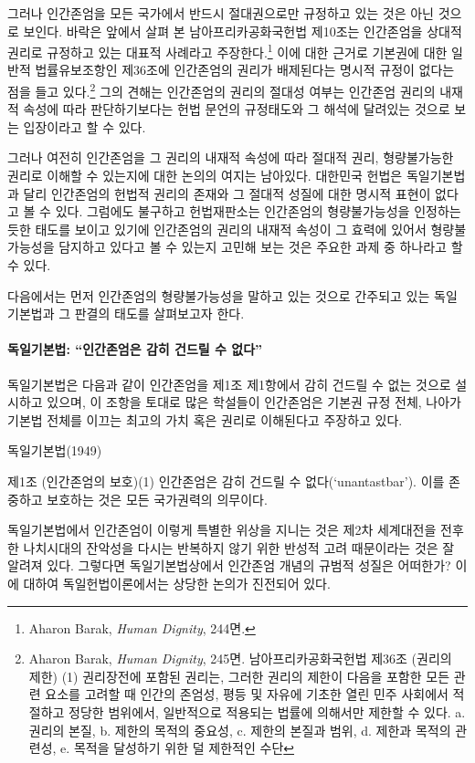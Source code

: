 그러나 인간존엄을 모든 국가에서 반드시 절대권으로만 규정하고 있는 것은 아닌 것으로 보인다. 바락은 앞에서 살펴 본 남아프리카공화국헌법 제10조는 인간존엄을 상대적 권리로 규정하고 있는 대표적 사례라고 주장한다.\footnote{Aharon Barak, \emph{Human Dignity}, 244면.} 이에 대한 근거로 기본권에 대한 일반적 법률유보조항인 제36조에 인간존엄의 권리가 배제된다는 명시적 규정이 없다는 점을 들고 있다.\footnote{Aharon Barak, \emph{Human Dignity}, 245면. 남아프리카공화국헌법 제36조 (권리의 제한) (1) 권리장전에 포함된 권리는, 그러한 권리의 제한이 다음을 포함한 모든 관련 요소를 고려할 때 인간의 존엄성, 평등 및 자유에 기초한 열린 민주 사회에서 적절하고 정당한 범위에서, 일반적으로 적용되는 법률에 의해서만 제한할 수 있다. a. 권리의 본질, b. 제한의 목적의 중요성, c. 제한의 본질과 범위, d. 제한과 목적의 관련성, e. 목적을 달성하기 위한 덜 제한적인 수단} 그의 견해는 인간존엄의 권리의 절대성 여부는 인간존엄 권리의 내재적 속성에 따라 판단하기보다는 헌법 문언의 규정태도와 그 해석에 달려있는 것으로 보는 입장이라고 할 수 있다.

그러나 여전히 인간존엄을 그 권리의 내재적 속성에 따라 절대적 권리, 형량불가능한 권리로 이해할 수 있는지에 대한 논의의 여지는 남아있다. 대한민국 헌법은 독일기본법과 달리 인간존엄의 헌법적 권리의 존재와 그 절대적 성질에 대한 명시적 표현이 없다고 볼 수 있다. 그럼에도 불구하고 헌법재판소는 인간존엄의 형량불가능성을 인정하는 듯한 태도를 보이고 있기에 인간존엄의 권리의 내재적 속성이 그 효력에 있어서 형량불가능성을 담지하고 있다고 볼 수 있는지 고민해 보는 것은 주요한 과제 중 하나라고 할 수 있다.

다음에서는 먼저 인간존엄의 형량불가능성을 말하고 있는 것으로 간주되고 있는 독일기본법과 그 판결의 태도를 살펴보고자 한다.

\paragraph{독일기본법: ``인간존엄은 감히 건드릴 수 없다''}

독일기본법은 다음과 같이 인간존엄을 제1조 제1항에서 감히 건드릴 수 없는 것으로 설시하고 있으며, 이 조항을 토대로 많은 학설들이 인간존엄은 기본권 규정 전체, 나아가 기본법 전체를 이끄는 최고의 가치 혹은 권리로 이해된다고 주장하고 있다.

독일기본법(1949)

제1조 (인간존엄의 보호)(1) 인간존엄은 감히 건드릴 수 없다(`unantastbar'). 이를 존중하고 보호하는 것은 모든 국가권력의 의무이다.

독일기본법에서 인간존엄이 이렇게 특별한 위상을 지니는 것은 제2차 세계대전을 전후한 나치시대의 잔악성을 다시는 반복하지 않기 위한 반성적 고려 때문이라는 것은 잘 알려져 있다. 그렇다면 독일기본법상에서 인간존엄 개념의 규범적 성질은 어떠한가? 이에 대하여 독일헌법이론에서는 상당한 논의가 진전되어 있다.

